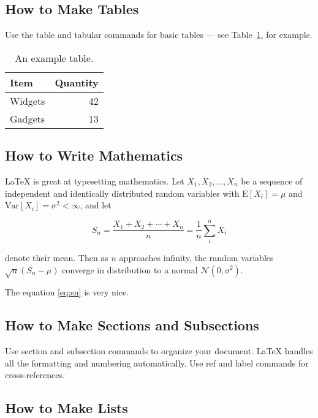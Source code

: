 \documentclass[a4paper]{article}
\begin{document}
\subsection{How to Make Tables}

Use the table and tabular commands for basic tables --- see Table~\ref{tab:widgets}, for example.

\begin{table}
    \centering
    \begin{tabular}{l|r}
        Item    & Quantity \\\hline
        Widgets & 42       \\
        Gadgets & 13
    \end{tabular}
    \caption{\label{tab:widgets}An example table.}
\end{table}

\subsection{How to Write Mathematics}

\LaTeX{} is great at typesetting mathematics. Let $X_1, X_2, \ldots, X_n$ be a sequence of independent and identically distributed random variables with $\text{E}[X_i] = \mu$ and $\text{Var}[X_i] = \sigma^2 < \infty$, and let

\begin{equation}
    S_n = \frac{X_1 + X_2 + \cdots + X_n}{n}
    = \frac{1}{n}\sum_{i}^{n} X_i
    \label{eq:sn}
\end{equation}

denote their mean. Then as $n$ approaches infinity, the random variables $\sqrt{n}(S_n - \mu)$ converge in distribution to a normal $\mathcal{N}(0, \sigma^2)$.

The equation \ref{eq:sn} is very nice.

\subsection{How to Make Sections and Subsections}

Use section and subsection commands to organize your document. \LaTeX{} handles all the formatting and numbering automatically. Use ref and label commands for cross-references.

\subsection{How to Make Lists}
\end{document}
